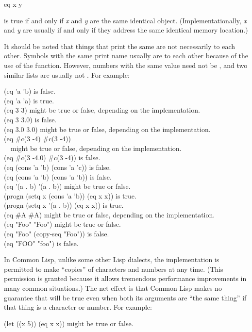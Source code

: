\begin{defun}[Function]
eq x y

 is true
if and only if \emph{x} and \emph{y} are the same identical object.
(Implementationally, \emph{x} and \emph{y} are usually
 if and only if they address the same identical memory location.)

It should be noted that things that print the same are not necessarily 
to each other.  Symbols with the same print name usually are  to
each other because of the use of the  function.
However, numbers with the same value
need not be , and two similar lists are usually not .
For example:
\begin{lisp}
(eq 'a 'b) \textrm{is false.} \\
(eq 'a 'a) \textrm{is true.} \\
(eq 3 3) \textrm{might be true or false, depending on the implementation.} \\
(eq 3 3.0) \textrm{is false.} \\
(eq 3.0 3.0) \textrm{might be true or false, depending on the implementation.} \\
(eq \#c(3 -4) \#c(3 -4)) \\
~~\textrm{might be true or false, depending on the implementation.} \\
(eq \#c(3 -4.0) \#c(3 -4)) \textrm{is false.} \\
(eq (cons 'a 'b) (cons 'a 'c)) \textrm{is false.} \\
(eq (cons 'a 'b) (cons 'a 'b)) \textrm{is false.} \\
(eq '(a . b) '(a . b)) \textrm{might be true or false.} \\
(progn (setq x (cons 'a 'b)) (eq x x)) \textrm{is true.} \\
(progn (setq x '(a . b)) (eq x x)) \textrm{is true.} \\
(eq \#{\Xbackslash}A \#{\Xbackslash}A) \textrm{might be true or false, depending on the implementation.} \\
(eq "Foo" "Foo") \textrm{might be true or false.} \\
(eq "Foo" (copy-seq "Foo")) \textrm{is false.} \\
(eq "FOO" "foo") \textrm{is false.}
\end{lisp}

In Common Lisp, unlike some other Lisp dialects, the implementation
is permitted to make ``copies'' of
characters and numbers at any time.  (This permission is granted
because it allows tremendous performance improvements in many
common situations.)  The net effect is that
Common Lisp makes no guarantee that  will be true even when both
its arguments are ``the same thing'' if that thing is a character or number.
For example:
\begin{lisp}
(let ((x 5)) (eq x x)) \textrm{might be true or false.}
\end{lisp}


\end{defun}

